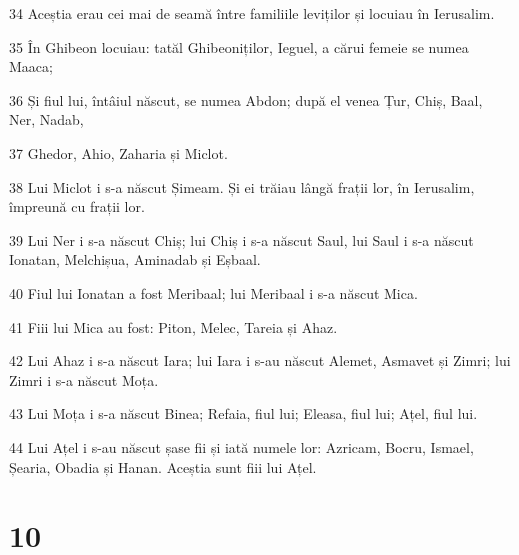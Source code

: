 \par 34 Aceștia erau cei mai de seamă între familiile leviților și locuiau în Ierusalim.
\par 35 În Ghibeon locuiau: tatăl Ghibeoniților, Ieguel, a cărui femeie se numea Maaca;
\par 36 Și fiul lui, întâiul născut, se numea Abdon; după el venea Țur, Chiș, Baal, Ner, Nadab,
\par 37 Ghedor, Ahio, Zaharia și Miclot.
\par 38 Lui Miclot i s-a născut Șimeam. Și ei trăiau lângă frații lor, în Ierusalim, împreună cu frații lor.
\par 39 Lui Ner i s-a născut Chiș; lui Chiș i s-a născut Saul, lui Saul i s-a născut Ionatan, Melchișua, Aminadab și Eșbaal.
\par 40 Fiul lui Ionatan a fost Meribaal; lui Meribaal i s-a născut Mica.
\par 41 Fiii lui Mica au fost: Piton, Melec, Tareia și Ahaz.
\par 42 Lui Ahaz i s-a născut Iara; lui Iara i s-au născut Alemet, Asmavet și Zimri; lui Zimri i s-a născut Moța.
\par 43 Lui Moța i s-a născut Binea; Refaia, fiul lui; Eleasa, fiul lui; Ațel, fiul lui.
\par 44 Lui Ațel i s-au născut șase fii și iată numele lor: Azricam, Bocru, Ismael, Șearia, Obadia și Hanan. Aceștia sunt fiii lui Ațel.

\chapter{10}

